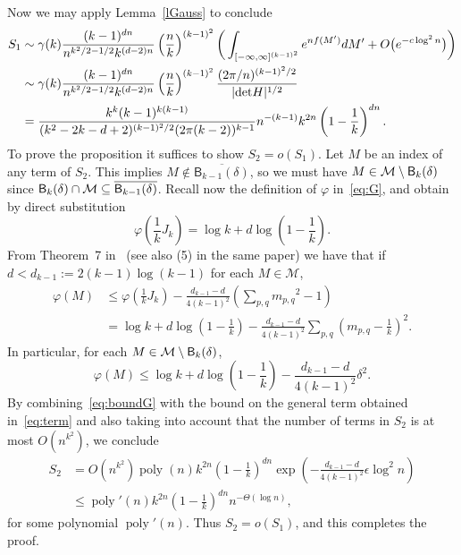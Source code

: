 \documentclass[12pt]{article}
\def\mdet{{\rm det}}
\def\M{{\cal M}}
\DeclareMathOperator{\poly}{poly}
\newcommand{\cM} {\ensuremath{\mathcal M}}
\newcommand{\B} {\ensuremath{\mathsf B}}
\begin{document}
Now we may apply Lemma~\ref{lGauss} to conclude
\begin{align}
S_1 &\sim \gamma(k) \frac{(k-1)^{dn}}{n^{k^2/2-1/2} k^{(d-2)n}} \left(\frac{n}{k}\right)^{(k-1)^2}
\bigg(\int_{[-\infty,\infty]^{(k-1)^2}} e^{nf(M')}dM' + O\big(e^{-c\log^2n}\big) \bigg)
\notag\\
&\sim
\gamma(k) \frac{(k-1)^{dn}}{n^{k^2/2-1/2} k^{(d-2)n}}
\left(\frac{n}{k}\right)^{(k-1)^2}
\frac{(2\pi/n)^{(k-1)^2/2}}{|\mdet H|^{1/2}}
\notag\\
&=
\frac{k^{k} (k-1)^{k(k-1)}} {(k^2-2k-d+2)^{(k-1)^2/2} (2\pi(k-2))^{k-1}}
n^{-(k-1)} k^{2n} \left(1-\frac{1}{k}\right)^{dn}.
\label{eS1c}
\end{align}
%
To prove the proposition it suffices to show $S_2=o(S_1)$.
Let $M$ be an index of any term of $S_2$.
This implies $M\not\in \overline{ \B_{k-1}(\delta)}$, so we must have 
$M\in\M\setminus \B_k(\delta)$
since $\B_k(\delta)\cap\M\subseteq\overline{ \B_{k-1}(\delta)}$.
Recall now the definition of $\varphi$ in~\eqref{eq:G}, and obtain by direct substitution
\[
\varphi\left(\frac{1}{k}J_k\right) = \log k + d\log\left(1-\frac{1}{k}\right).
\]
{From} Theorem~7 in~\cite{AN} (see also (5) in the same paper) we have that if $d<d_{k-1}:=2(k-1)\log(k-1)$ for each $M\in\cM$,
%
\begin{align*}
\varphi(M) &\le \varphi\left(\frac{1}{k}J_k\right) - \frac{d_{k-1}-d}{4(k-1)^2}\left(\sum_{p,q} {m_{p,q}}^2 - 1\right)
\\
&= \log k + d\log\left(1-\frac{1}{k}\right) - \frac{d_{k-1}-d}{4(k-1)^2} \sum_{p,q} \left(m_{p,q}-\frac{1}{k}\right)^2.
\end{align*}
%
In particular, for each $M\in\M\setminus \B_k(\delta)$,
%
\begin{equation}
\varphi(M) \le \log k + d\log\left(1-\frac{1}{k}\right) - \frac{d_{k-1}-d}{4(k-1)^2} \delta^2.
\label{eq:boundG}
\end{equation}
%
By combining~\eqref{eq:boundG} with the bound on the general term obtained in~\eqref{eq:term} and also taking into account that the number of terms in $S_2$ is at most $O(n^{k^2})$, we conclude
%
\begin{align*}
S_2 &= O(n^{k^2}) \poly(n) k^{2n} \left(1-\frac{1}{k}\right)^{dn} \exp\left(- \frac{d_{k-1}-d}{4(k-1)^2} \epsilon\log^2 n\right)
\\&\le \poly'(n) k^{2n} \left(1-\frac{1}{k}\right)^{dn} n^{- \Theta(\log n)},
\end{align*}
for some polynomial $\poly'(n)$. Thus $S_2= o(S_1)$, and this completes the proof.
\end{document}
